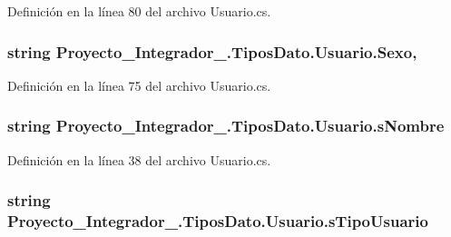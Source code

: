 Definición en la línea 80 del archivo Usuario.\-cs.

\hypertarget{class_proyecto___integrador__3_1_1_tipos_dato_1_1_usuario_ac9a394490635d1d8083c88df4d02a84e}{
\subsubsection[{Sexo}]{\setlength{\rightskip}{0pt plus 5cm}string Proyecto\-\_\-\-Integrador\-\_.\-Tipos\-Dato.\-Usuario.\-Sexo\hspace{0.3cm}{\ttfamily [get]}, {\ttfamily [set]}}}\label{class_proyecto___integrador__3_1_1_tipos_dato_1_1_usuario_ac9a394490635d1d8083c88df4d02a84e}


Definición en la línea 75 del archivo Usuario.\-cs.

\hypertarget{class_proyecto___integrador__3_1_1_tipos_dato_1_1_usuario_a22974b12ffb877b220ac230d9ce48615}{
\subsubsection[{s\-Nombre}]{\setlength{\rightskip}{0pt plus 5cm}string Proyecto\-\_\-\-Integrador\-\_.\-Tipos\-Dato.\-Usuario.\-s\-Nombre\hspace{0.3cm}{\ttfamily [get]}}}\label{class_proyecto___integrador__3_1_1_tipos_dato_1_1_usuario_a22974b12ffb877b220ac230d9ce48615}


Definición en la línea 38 del archivo Usuario.\-cs.

\hypertarget{class_proyecto___integrador__3_1_1_tipos_dato_1_1_usuario_a11a9f4324ce06becd4385cdf769f5c4e}{
\subsubsection[{s\-Tipo\-Usuario}]{\setlength{\rightskip}{0pt plus 5cm}string Proyecto\-\_\-\-Integrador\-\_.\-Tipos\-Dato.\-Usuario.\-s\-Tipo\-Usuario\hspace{0.3cm}{\ttfamily [get]}}}\label{class_proyecto___integrador__3_1_1_tipos_dato_1_1_usuario_a11a9f4324ce06becd4385cdf769f5c4e}


